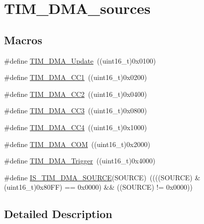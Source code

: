 \hypertarget{group___t_i_m___d_m_a__sources}{}\section{T\+I\+M\+\_\+\+D\+M\+A\+\_\+sources}
\label{group___t_i_m___d_m_a__sources}
\subsection*{Macros}
\begin{DoxyCompactItemize}
\item 
\#define \mbox{\hyperlink{group___t_i_m___d_m_a__sources_ga013a49e5cceb263f01941aef968dea9c}{T\+I\+M\+\_\+\+D\+M\+A\+\_\+\+Update}}~((uint16\+\_\+t)0x0100)
\item 
\#define \mbox{\hyperlink{group___t_i_m___d_m_a__sources_ga33b93e8bb82fe8e167b9e9c962c54f83}{T\+I\+M\+\_\+\+D\+M\+A\+\_\+\+C\+C1}}~((uint16\+\_\+t)0x0200)
\item 
\#define \mbox{\hyperlink{group___t_i_m___d_m_a__sources_ga792f73196a8e7424655592097d7a3fd5}{T\+I\+M\+\_\+\+D\+M\+A\+\_\+\+C\+C2}}~((uint16\+\_\+t)0x0400)
\item 
\#define \mbox{\hyperlink{group___t_i_m___d_m_a__sources_ga3eb2dadbd3109bced45935fb53deeee1}{T\+I\+M\+\_\+\+D\+M\+A\+\_\+\+C\+C3}}~((uint16\+\_\+t)0x0800)
\item 
\#define \mbox{\hyperlink{group___t_i_m___d_m_a__sources_ga59495cf79894dfe5e5b2029863aed956}{T\+I\+M\+\_\+\+D\+M\+A\+\_\+\+C\+C4}}~((uint16\+\_\+t)0x1000)
\item 
\#define \mbox{\hyperlink{group___t_i_m___d_m_a__sources_gac5f4c56e944bda8ba0c23b97275020ba}{T\+I\+M\+\_\+\+D\+M\+A\+\_\+\+C\+OM}}~((uint16\+\_\+t)0x2000)
\item 
\#define \mbox{\hyperlink{group___t_i_m___d_m_a__sources_ga81ad169a378969524e61396337d84a0a}{T\+I\+M\+\_\+\+D\+M\+A\+\_\+\+Trigger}}~((uint16\+\_\+t)0x4000)
\item 
\#define \mbox{\hyperlink{group___t_i_m___d_m_a__sources_gafb9cb1995ea4cd37db6032d80a49cd47}{I\+S\+\_\+\+T\+I\+M\+\_\+\+D\+M\+A\+\_\+\+S\+O\+U\+R\+CE}}(S\+O\+U\+R\+CE)~((((S\+O\+U\+R\+CE) \& (uint16\+\_\+t)0x80\+F\+F) == 0x0000) \&\& ((\+S\+O\+U\+R\+C\+E) != 0x0000))
\end{DoxyCompactItemize}


\subsection{Detailed Description}


